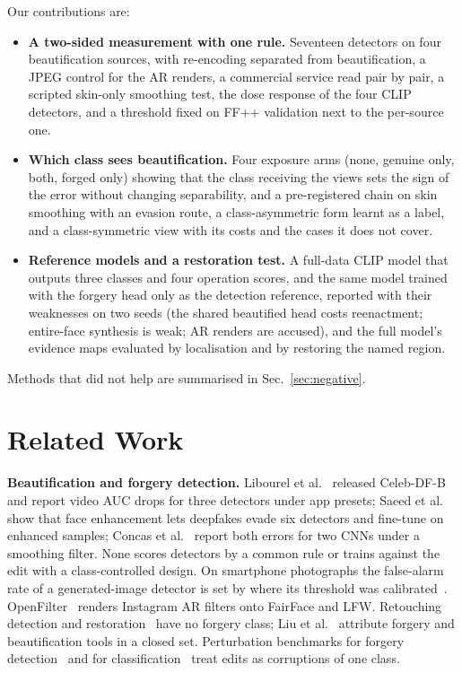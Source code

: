 \documentclass[conference]{IEEEtran}
\begin{document}
Our contributions are:
\begin{itemize}
\item \textbf{A two-sided measurement with one rule.} Seventeen detectors on four beautification sources, with re-encoding
separated from beautification, a JPEG control for the AR renders, a commercial service read pair by pair, a scripted skin-only
smoothing test, the dose response of the four CLIP detectors, and a threshold fixed on FF++ validation next to the per-source one.
\item \textbf{Which class sees beautification.} Four exposure arms (none, genuine only, both, forged only) showing that the class
receiving the views sets the sign of the error without changing separability, and a pre-registered chain on skin smoothing with
an evasion route, a class-asymmetric form learnt as a label, and a class-symmetric view with its costs and the cases it does not
cover.
\item \textbf{Reference models and a restoration test.} A full-data CLIP model that outputs three classes and four operation
scores, and the same model trained with the forgery head only as the detection reference, reported with their weaknesses on two
seeds (the shared beautified head costs reenactment; entire-face synthesis is weak; AR renders are accused), and the full model's
evidence maps evaluated by localisation and by restoring the named region.
\end{itemize}
Methods that did not help are summarised in Sec.~\ref{sec:negative}.

\section{Related Work}
\textbf{Beautification and forgery detection.} Libourel et al.~\cite{libourel2024} released Celeb-DF-B and report video AUC
drops for three detectors under app presets; Saeed et al.~\cite{saeed2025} show that face enhancement lets deepfakes evade six
detectors and fine-tune on enhanced samples; Concas et al.~\cite{concas2025} report both errors for two CNNs under a smoothing
filter. None scores detectors by a common rule or trains against the edit with a class-controlled design. On smartphone
photographs the false-alarm rate of a generated-image detector is set by where its threshold was
calibrated~\cite{laionmobile2026}. OpenFilter~\cite{openfilter2022} renders Instagram AR filters onto FairFace and LFW.
Retouching detection and restoration~\cite{bharati2016,jain2018,wang2019photoshop,
retouchingffhq,frrffusion,mofrr,reface} have no forgery class; Liu et al.~\cite{miea2026} attribute forgery and beautification
tools in a closed set. Perturbation benchmarks for forgery detection~\cite{deeperforensics2020,moire2025} and for
classification~\cite{hendrycks2019} treat edits as corruptions of one class.
\end{document}

